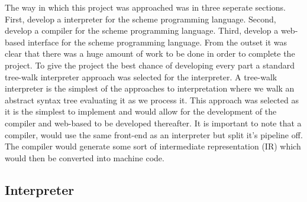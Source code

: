 \documentclass[final]{cmpreport_02}
\begin{document}
The way in which this project was approached was in three seperate sections. First, develop a interpreter for the scheme programming language. Second, develop a compiler for the scheme programming language. Third, develop a web-based interface for the scheme programming language.
From the outset it was clear that there was a huge amount of work to be done in order to complete the project. To give the project the best chance of developing every part a standard tree-walk interpreter approach was selected for the interpreter.
A tree-walk interpreter is the simplest of the approaches to interpretation where we walk an abstract syntax tree evaluating it as we process it. This approach was selected as it is the simplest to implement and would allow for the development of the compiler and web-based to be developed thereafter.
It is important to note that a compiler, would use the same front-end as an interpreter but split it's pipeline off. The compiler would generate some sort of intermediate representation (IR) which would then be converted into machine code.

\subsection{Interpreter}
\end{document}

